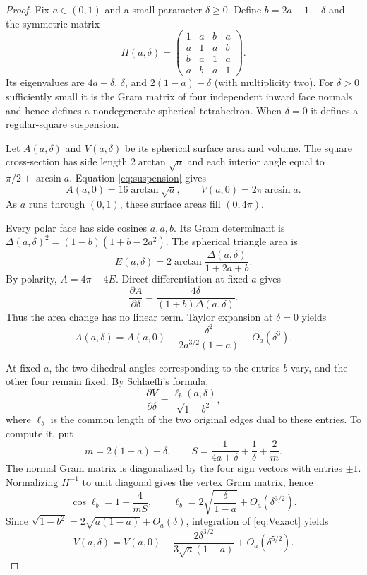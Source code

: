 \documentclass[11pt,reqno]{amsart}
\theoremstyle{remark}
\begin{document}
\begin{proof}
Fix $a\in(0,1)$ and a small parameter $\delta\ge0$. Define $b=2a-1+\delta$ and the symmetric matrix
\begin{equation}\label{eq:gram-family}
 H(a,\delta)=\begin{pmatrix}
 1&a&b&a\\ a&1&a&b\\ b&a&1&a\\ a&b&a&1
 \end{pmatrix}.
\end{equation}
Its eigenvalues are $4a+\delta$, $\delta$, and $2(1-a)-\delta$ (with multiplicity two). For $\delta>0$ sufficiently small it is the Gram matrix of four independent inward face normals and hence defines a nondegenerate spherical tetrahedron. When $\delta=0$ it defines a regular-square suspension.

Let $A(a,\delta)$ and $V(a,\delta)$ be its spherical surface area and volume. The square cross-section has side length $2\arctan\sqrt a$ and each interior angle equal to $\pi/2+\arcsin a$. Equation \eqref{eq:suspension} gives
\begin{equation}\label{eq:boundary-base}
 A(a,0)=16\arctan\sqrt a,
 \qquad V(a,0)=2\pi\arcsin a.
\end{equation}
As $a$ runs through $(0,1)$, these surface areas fill $(0,4\pi)$.

Every polar face has side cosines $a,a,b$. Its Gram determinant is
$\Delta(a,\delta)^2=(1-b)(1+b-2a^2)$. The spherical triangle area is
\[
 E(a,\delta)=2\arctan\frac{\Delta(a,\delta)}{1+2a+b}.
\]
By polarity, $A=4\pi-4E$. Direct differentiation at fixed $a$ gives
\begin{equation}\label{eq:Aexact}
 \frac{\partial A}{\partial\delta}
 =\frac{4\delta}{(1+b)\Delta(a,\delta)}.
\end{equation}
Thus the area change has no linear term. Taylor expansion at $\delta=0$ yields
\begin{equation}\label{eq:Aexpansion}
 A(a,\delta)=A(a,0)
 +\frac{\delta^2}{2a^{3/2}(1-a)}+O_a(\delta^3).
\end{equation}

At fixed $a$, the two dihedral angles corresponding to the entries $b$ vary, and the other four remain fixed. By Schlaefli's formula,
\begin{equation}\label{eq:Vexact}
 \frac{\partial V}{\partial\delta}
 =\frac{\ell_b(a,\delta)}{\sqrt{1-b^2}},
\end{equation}
where $\ell_b$ is the common length of the two original edges dual to these entries. To compute it, put
\[
 m=2(1-a)-\delta,
 \qquad S=\frac1{4a+\delta}+\frac1\delta+\frac2m.
\]
The normal Gram matrix is diagonalized by the four sign vectors with entries $\pm1$. Normalizing $H^{-1}$ to unit diagonal gives the vertex Gram matrix, hence
\[
 \cos\ell_b=1-\frac4{mS},\qquad
 \ell_b=2\sqrt{\frac\delta{1-a}}+O_a(\delta^{3/2}).
\]
Since $\sqrt{1-b^2}=2\sqrt{a(1-a)}+O_a(\delta)$, integration of \eqref{eq:Vexact} yields
\begin{equation}\label{eq:Vexpansion}
 V(a,\delta)=V(a,0)
 +\frac{2\delta^{3/2}}{3\sqrt a(1-a)}
 +O_a(\delta^{5/2}).
\end{equation}


\end{proof}
\end{document}
